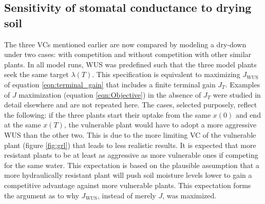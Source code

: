 \documentclass[utf8]{frontiersSCNS} %
\begin{document}



\subsection{Sensitivity of stomatal conductance to drying soil}

The three VCs mentioned earlier are now compared by modeling a dry-down under two cases: with competition and without competition with other similar plants. In all model runs, WUS was predefined such that the three model plants seek the same target $\lambda(T)$. This specification is equivalent to maximizing $J_{\text{WUS}}$ of equation \ref{eqn:terminal_gain} that includes a finite terminal gain $J_T$. Examples of $J$ maximization (equation \ref{eqn:Objective}) in the absence of $J_T$ were studied in detail elsewhere \citep{manzoni_optimization_2013} and are not repeated here. The cases, selected purposely, reflect the following: if the three plants start their uptake from the same $x(0)$ and end at the same $x(T)$, the vulnerable plant would have to adopt a more aggressive WUS than the other two. This is due to the more limiting VC of the vulnerable plant (figure \ref{fig:grl}) that leads to less realistic results. It is expected that more resistant plants to be at least as aggressive as more vulnerable ones if competing for the same water. This expectation is based on the plausible assumption that a more hydraulically resistant plant will push soil moisture levels lower to gain a competitive advantage against more vulnerable plants. This expectation forms the argument as to why $J_{\text{WUS}}$, instead of merely $J$, was maximized.
\end{document}
